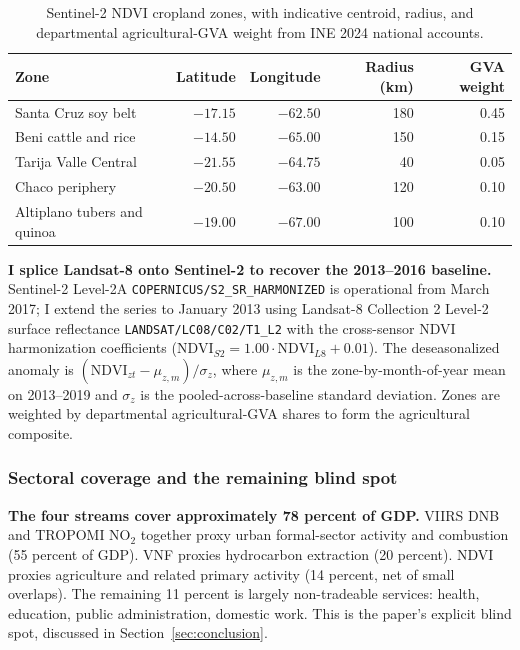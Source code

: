 \documentclass[11pt,letterpaper]{article}
\newcommand{\claim}[1]{\textbf{#1.}}
\begin{document}
\begin{table}[H]
\centering
\caption{Sentinel-2 NDVI cropland zones, with indicative centroid, radius, and departmental agricultural-GVA weight from INE 2024 national accounts.}
\label{tab:ndvi_zones}
\small
\begin{tabular}{lrrrr}
\toprule
Zone & Latitude & Longitude & Radius (km) & GVA weight \\
\midrule
Santa Cruz soy belt & $-17.15$ & $-62.50$ & \num{180} & \num{0.45} \\
Beni cattle and rice & $-14.50$ & $-65.00$ & \num{150} & \num{0.15} \\
Tarija Valle Central & $-21.55$ & $-64.75$ & \num{40} & \num{0.05} \\
Chaco periphery & $-20.50$ & $-63.00$ & \num{120} & \num{0.10} \\
Altiplano tubers and quinoa & $-19.00$ & $-67.00$ & \num{100} & \num{0.10} \\
\bottomrule
\end{tabular}
\end{table}

\claim{I splice Landsat-8 onto Sentinel-2 to recover the 2013--2016 baseline} Sentinel-2 Level-2A \texttt{COPERNICUS/S2\_SR\_HARMONIZED} is operational from March \num{2017}; I extend the series to January \num{2013} using Landsat-8 Collection 2 Level-2 surface reflectance \texttt{LANDSAT/LC08/C02/T1\_L2} with the \citet{roy_etal2016} cross-sensor NDVI harmonization coefficients ($\mathrm{NDVI}_{S2} = 1.00 \cdot \mathrm{NDVI}_{L8} + 0.01$). The deseasonalized anomaly is $(\mathrm{NDVI}_{zt} - \mu_{z,m}) / \sigma_z$, where $\mu_{z,m}$ is the zone-by-month-of-year mean on \numrange{2013}{2019} and $\sigma_z$ is the pooled-across-baseline standard deviation. Zones are weighted by departmental agricultural-GVA shares to form the agricultural composite.

\subsubsection{Sectoral coverage and the remaining blind spot}

\claim{The four streams cover approximately \num{78} percent of GDP} VIIRS DNB and TROPOMI NO$_2$ together proxy urban formal-sector activity and combustion (\num{55} percent of GDP). VNF proxies hydrocarbon extraction (\num{20} percent). NDVI proxies agriculture and related primary activity (\num{14} percent, net of small overlaps). The remaining \num{11} percent is largely non-tradeable services: health, education, public administration, domestic work. This is the paper's explicit blind spot, discussed in Section~\ref{sec:conclusion}.
\end{document}
